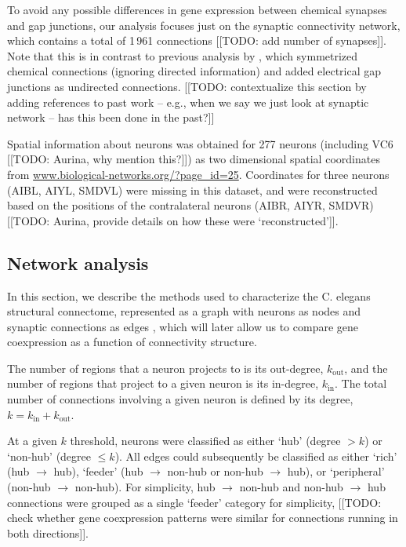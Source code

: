 \documentclass[10pt,letterpaper]{article}
\begin{document}
To avoid any possible differences in gene expression between chemical synapses and gap junctions, our analysis focuses just on the synaptic connectivity network, which contains a total of 1\,961 connections [[TODO: add number of synapses]].
Note that this is in contrast to previous analysis by \citet{Towlson:2013gf}, which symmetrized chemical connections (ignoring directed information) and added electrical gap junctions as undirected connections.
[[TODO: contextualize this section by adding references to past work -- e.g., when we say we just look at synaptic network -- has this been done in the past?]]

Spatial information about neurons was obtained for 277 neurons (including VC6 [[TODO: Aurina, why mention this?]]) as two dimensional spatial coordinates from \url{www.biological-networks.org/?page_id=25}.
Coordinates for three neurons (AIBL, AIYL, SMDVL) were missing in this dataset, and were reconstructed based on the positions of the contralateral neurons (AIBR, AIYR, SMDVR) [[TODO: Aurina, provide details on how these were `reconstructed']].

\subsection*{Network analysis}

In this section, we describe the methods used to characterize the C. elegans structural connectome, represented as a graph with neurons as nodes and synaptic connections as edges \cite{Schroter:2017eo}, which will later allow us to compare gene coexpression as a function of connectivity structure.

The number of regions that a neuron projects to is its out-degree, $k_\mathrm{out}$, and the number of regions that project to a given neuron is its in-degree, $k_\mathrm{in}$.
The total number of connections involving a given neuron is defined by its degree, $k = k_\mathrm{in} + k_\mathrm{out}$.

At a given $k$ threshold, neurons were classified as either `hub' (degree $>k$) or `non-hub' (degree $\leq k$).
All edges could subsequently be classified as either `rich' (hub $\rightarrow$ hub), `feeder' (hub $\rightarrow$ non-hub or non-hub $\rightarrow$ hub), or `peripheral' (non-hub $\rightarrow$ non-hub).
For simplicity, hub $\rightarrow$ non-hub and non-hub $\rightarrow$ hub connections were grouped as a single `feeder' category for simplicity, [[TODO: check whether gene coexpression patterns were similar for connections running in both directions]].
\end{document}
